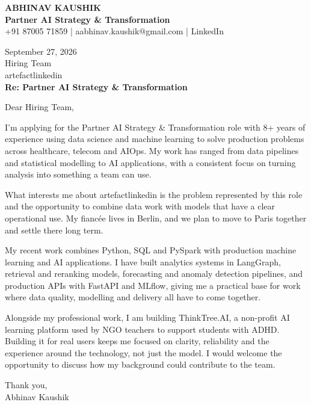 \documentclass[10pt,a4paper]{article}
\begin{document}
\begin{center}
{\Large\bfseries ABHINAV KAUSHIK}\\[2pt]
{\bfseries Partner AI Strategy \& Transformation}\\[2pt]
+91 87005 71859 \quad | \quad aabhinav.kaushik@gmail.com \quad | \quad LinkedIn
\end{center}
\vspace{8pt}
September 27, 2026\\[6pt]
Hiring Team\\
artefactlinkedin\\[4pt]
\textbf{Re: Partner AI Strategy \& Transformation}

Dear Hiring Team,

I’m applying for the Partner AI Strategy \& Transformation role with 8+ years of experience using data science and machine learning to solve production problems across healthcare, telecom and AIOps. My work has ranged from data pipelines and statistical modelling to AI applications, with a consistent focus on turning analysis into something a team can use.

What interests me about artefactlinkedin is the problem represented by this role and the opportunity to combine data work with models that have a clear operational use. My fiancée lives in Berlin, and we plan to move to Paris together and settle there long term.

My recent work combines Python, SQL and PySpark with production machine learning and AI applications. I have built analytics systems in LangGraph, retrieval and reranking models, forecasting and anomaly detection pipelines, and production APIs with FastAPI and MLflow, giving me a practical base for work where data quality, modelling and delivery all have to come together.

Alongside my professional work, I am building ThinkTree.AI, a non-profit AI learning platform used by NGO teachers to support students with ADHD. Building it for real users keeps me focused on clarity, reliability and the experience around the technology, not just the model. I would welcome the opportunity to discuss how my background could contribute to the team.

Thank you,\\
Abhinav Kaushik
\end{document}
